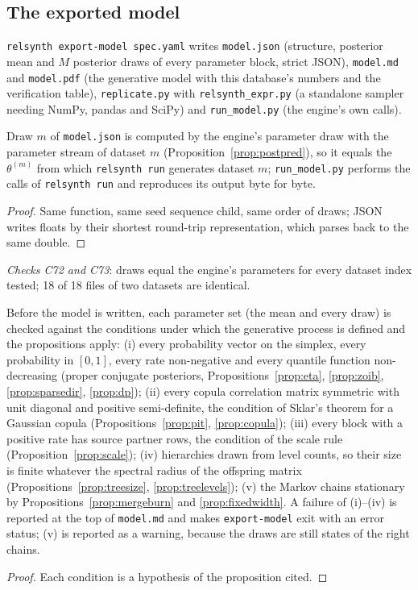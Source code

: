 \subsection{The exported model}
\texttt{relsynth export-model spec.yaml} writes \texttt{model.json} (structure, posterior mean and $M$ posterior draws of every parameter block, strict JSON), \texttt{model.md} and \texttt{model.pdf} (the generative model with this database's numbers and the verification table), \texttt{replicate.py} with \texttt{relsynth\_expr.py} (a standalone sampler needing NumPy, pandas and SciPy) and \texttt{run\_model.py} (the engine's own calls).

\begin{proposition}\label{prop:exportdraw}
Draw $m$ of \texttt{model.json} is computed by the engine's parameter draw with the parameter stream of dataset $m$ (Proposition~\ref{prop:postpred}), so it equals the $\theta^{(m)}$ from which \texttt{relsynth run} generates dataset $m$; \texttt{run\_model.py} performs the calls of \texttt{relsynth run} and reproduces its output byte for byte.
\end{proposition}
\begin{proof}
Same function, same seed sequence child, same order of draws; JSON writes floats by their shortest round-trip representation, which parses back to the same double.
\end{proof}
\noindent \emph{Checks C72 and C73}: draws equal the engine's parameters for every dataset index tested; 18 of 18 files of two datasets are identical.

\begin{proposition}\label{prop:verify}
Before the model is written, each parameter set (the mean and every draw) is checked against the conditions under which the generative process is defined and the propositions apply: (i) every probability vector on the simplex, every probability in $[0,1]$, every rate non-negative and every quantile function non-decreasing (proper conjugate posteriors, Propositions~\ref{prop:eta}, \ref{prop:zoib}, \ref{prop:sparsedir}, \ref{prop:dp}); (ii) every copula correlation matrix symmetric with unit diagonal and positive semi-definite, the condition of Sklar's theorem for a Gaussian copula (Propositions~\ref{prop:pit}, \ref{prop:copula}); (iii) every block with a positive rate has source partner rows, the condition of the scale rule (Proposition~\ref{prop:scale}); (iv) hierarchies drawn from level counts, so their size is finite whatever the spectral radius of the offspring matrix (Propositions~\ref{prop:treesize}, \ref{prop:treelevels}); (v) the Markov chains stationary by Propositions~\ref{prop:mergeburn} and \ref{prop:fixedwidth}. A failure of (i)--(iv) is reported at the top of \texttt{model.md} and makes \texttt{export-model} exit with an error status; (v) is reported as a warning, because the draws are still states of the right chains.
\end{proposition}
\begin{proof}
Each condition is a hypothesis of the proposition cited.
\end{proof}

